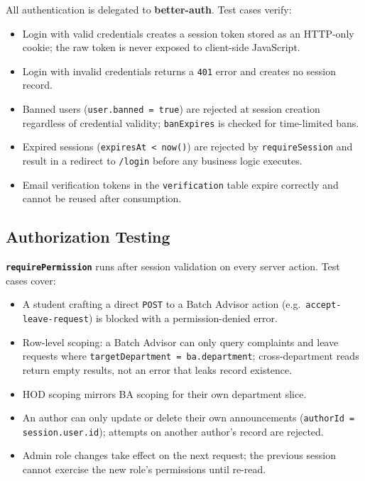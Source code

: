 All authentication is delegated to \textbf{better-auth}. Test cases verify:

\begin{itemize}
    \item Login with valid credentials creates a session token stored as an HTTP-only cookie;
          the raw token is never exposed to client-side JavaScript.
    \item Login with invalid credentials returns a \texttt{401} error and creates no session record.
    \item Banned users (\texttt{user.banned = true}) are rejected at session creation regardless
          of credential validity; \texttt{banExpires} is checked for time-limited bans.
    \item Expired sessions (\texttt{expiresAt < now()}) are rejected by \texttt{requireSession}
          and result in a redirect to \texttt{/login} before any business logic executes.
    \item Email verification tokens in the \texttt{verification} table expire correctly and
          cannot be reused after consumption.
\end{itemize}

\subsection{Authorization Testing}

\textbf{\texttt{requirePermission}} runs after session validation on every server action.
Test cases cover:

\begin{itemize}
    \item A student crafting a direct \texttt{POST} to a Batch Advisor action (e.g.\
          \texttt{accept-leave-request}) is blocked with a permission-denied error.
    \item Row-level scoping: a Batch Advisor can only query complaints and leave requests
          where \texttt{targetDepartment = ba.department}; cross-department reads return
          empty results, not an error that leaks record existence.
    \item HOD scoping mirrors BA scoping for their own department slice.
    \item An author can only update or delete their own announcements
          (\texttt{authorId = session.user.id}); attempts on another author's record are rejected.
    \item Admin role changes take effect on the next request; the previous session cannot
          exercise the new role's permissions until re-read.
\end{itemize}

